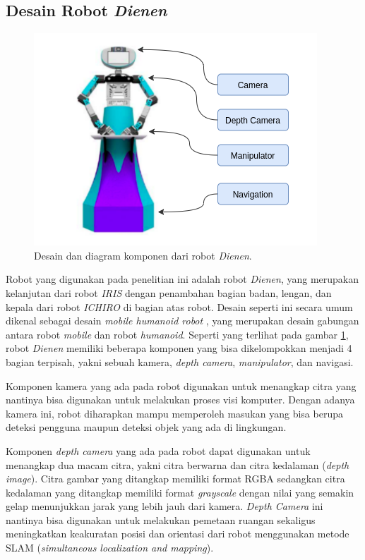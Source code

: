 \subsection{Desain Robot \emph{Dienen}}
\label{subsec:desainrobotdienen}

\begin{figure} [ht]
  \centering
  \includegraphics[scale=0.5]{gambar/komponen-robot.png}
  \caption{Desain dan diagram komponen dari robot \emph{Dienen}.}
  \label{fig:komponenrobot}
\end{figure}

Robot yang digunakan pada penelitian ini adalah robot \emph{Dienen},
  yang merupakan kelanjutan dari robot \emph{IRIS} \citep{cit:dikairono2020}\citep{cit:zanuar2019} dengan penambahan bagian badan, lengan, dan kepala dari robot \emph{ICHIRO} \citep{cit:muhtadin2019} di bagian atas robot.
Desain seperti ini secara umum dikenal sebagai desain \emph{mobile humanoid robot} \citep{cit:mohamed2012}, yang merupakan desain gabungan antara robot \emph{mobile} dan robot \emph{humanoid}.
Seperti yang terlihat pada gambar \ref{fig:komponenrobot},
  robot \emph{Dienen} memiliki beberapa komponen yang bisa dikelompokkan menjadi 4 bagian terpisah, yakni sebuah kamera, \emph{depth camera}, \emph{manipulator}, dan navigasi.

Komponen kamera yang ada pada robot digunakan untuk menangkap citra yang nantinya bisa digunakan untuk melakukan proses visi komputer.
Dengan adanya kamera ini, robot diharapkan mampu memperoleh masukan yang bisa berupa deteksi pengguna maupun deteksi objek yang ada di lingkungan.

Komponen \emph{depth camera} yang ada pada robot dapat digunakan untuk menangkap dua macam citra,
  yakni citra berwarna dan citra kedalaman (\emph{depth image}).
Citra gambar yang ditangkap memiliki format RGBA sedangkan citra kedalaman yang ditangkap memiliki format \emph{grayscale} dengan nilai yang semakin gelap menunjukkan jarak yang lebih jauh dari kamera.
\emph{Depth Camera} ini nantinya bisa digunakan untuk melakukan pemetaan ruangan sekaligus meningkatkan keakuratan posisi dan orientasi dari robot menggunakan metode SLAM (\emph{simultaneous localization and mapping}).

